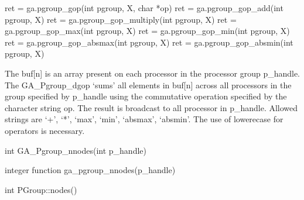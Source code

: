 \documentclass[10pt]{article}
\begin{document}
\begin{pyapi}
\begin{pycode}
ret = ga.pgroup_gop(int pgroup, X, char *op)
ret = ga.pgroup_gop_add(int pgroup, X)
ret = ga.pgroup_gop_multiply(int pgroup, X)
ret = ga.pgroup_gop_max(int pgroup, X)
ret = ga.pgroup_gop_min(int pgroup, X)
ret = ga.pgroup_gop_absmax(int pgroup, X)
ret = ga.pgroup_gop_absmin(int pgroup, X)
\end{pycode}
\begin{funcargs}
\end{funcargs}
\end{pyapi}

\gcoll

\begin{desc}
The buf[n] is an array present on each processor in the processor group
p_handle. The GA_Pgroup_dgop `sums' all elements in buf[n] across all
processors in the group specified by p_handle using the commutative operation
specified by the character string op.  The result is broadcast to all processor
in p_handle. Allowed strings are `+', `*', `max', `min', `absmax', `absmin'.
The use of lowerecase for operators is necessary.
\end{desc}




\begin{capi}
\begin{ccode}
int GA_Pgroup_nnodes(int p_handle)
\end{ccode}
\begin{funcargs}
\end{funcargs}
\end{capi}

\begin{fapi}
\begin{fcode}
integer function ga_pgroup_nnodes(p_handle)
\end{fcode}
\begin{funcargs}
\end{funcargs}
\end{fapi}

\begin{cxxapi}
\begin{cxxcode}
int PGroup::nodes()
\end{cxxcode}
\end{cxxapi}
\end{document}
